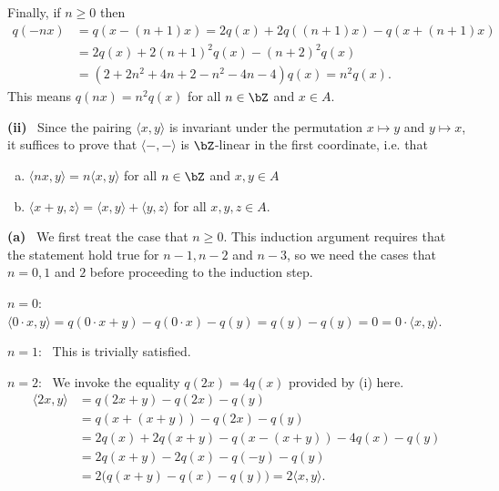\begin{homework}[e]
\begin{prf}
		Finally, if $n \geq 0$ then
		\begin{align*}
			q(-nx) &= q(x - (n+1)x) = 2q(x)+2q((n+1)x) - q(x+(n+1)x) \\
				   &= 2q(x) + 2(n+1)^2q(x) - (n+2)^2q(x) \\
				   &= (2 + 2n^2+4n+2 - n^2 - 4n - 4)q(x) = n^2 q(x).
		\end{align*}
		This means $q(nx) = n^2q(x)$ for all $n \in \bZ$ and $x \in A$.
		
		\bigskip

		\noindent \textbf{(ii)}~ Since the pairing $\langle x,y\rangle$ is invariant under the permutation $x \mapsto y$ and $y \mapsto x$, it suffices to prove that $\langle -,-\rangle$ is $\bZ$-linear in the first coordinate, i.e. that 
		\begin{enumerate}[(a)]
			\item $\langle nx,y\rangle = n\langle x,y\rangle$ for all $n \in \bZ$ and $x,y \in A$
			\item $\langle x+y,z\rangle = \langle x,y\rangle + \langle y,z\rangle$ for all $x,y,z \in A$.
		\end{enumerate}
		
		\bigskip

		\noindent\textbf{(a)}~ We first treat the case that $n \geq 0$. This induction argument requires that the statement hold true for $n-1,n-2$ and $n - 3$, so we need the cases that $n = 0, 1$ and $2$ before proceeding to the induction step.

		\noindent \hspace{1em}\underline{$n = 0$}:~ $\langle 0 \cdot x,y\rangle = q(0\cdot x + y) - q(0\cdot x) - q(y) = q(y) - q(y) = 0 = 0\cdot \langle x,y\rangle$.

		\noindent \hspace{1em}\underline{$n = 1$}:~ This is trivially satisfied.

		\noindent \hspace{1em}\underline{$n = 2$}:~ We invoke the equality $q(2x) = 4q(x)$ provided by (i) here.
		\begin{align*}
			\langle 2x,y\rangle &= q(2x + y) - q(2x) - q(y) \\
				&= q(x + (x+y)) - q(2x) - q(y) \\
				&= 2q(x) + 2q(x+y) - q(x - (x+y)) - 4q(x) - q(y) \\
				&= 2q(x+y) - 2q(x) - q(-y) - q(y) \\
				&= 2\big(q(x+y) -q(x) - q(y)\big) = 2\langle x,y\rangle.
		\end{align*}
        

\end{prf}
\end{homework}
